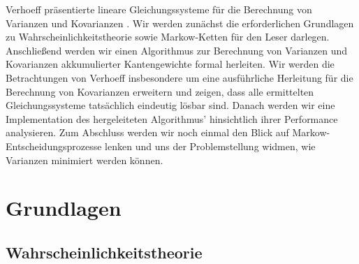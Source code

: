 \documentclass[a4paper]{article}
\newcommand{\mc}{Markow-Kette}
\theoremstyle{nonumberplain}
\begin{document}
	
	Verhoeff präsentierte lineare Gleichungssysteme für die Berechnung von Varianzen und Kovarianzen \cite{Verh04}. Wir werden zunächst die erforderlichen Grundlagen zu Wahrscheinlichkeitstheorie sowie \mc{}n für den Leser darlegen. Anschließend werden wir einen Algorithmus zur Berechnung von Varianzen und Kovarianzen akkumulierter Kantengewichte formal herleiten. Wir werden  die Betrachtungen von Verhoeff insbesondere um eine ausführliche Herleitung für die Berechnung von Kovarianzen erweitern und zeigen, dass alle ermittelten Gleichungssysteme tatsächlich eindeutig lösbar sind. Danach werden wir eine Implementation des hergeleiteten Algorithmus' hinsichtlich ihrer Performance analysieren. Zum Abschluss werden wir noch einmal den Blick auf Markow-Entscheidungsprozesse lenken und uns der Problemstellung widmen, wie Varianzen minimiert werden können.
	
	\section{Grundlagen}
	
	\subsection{Wahrscheinlichkeitstheorie}
	
\end{document}
